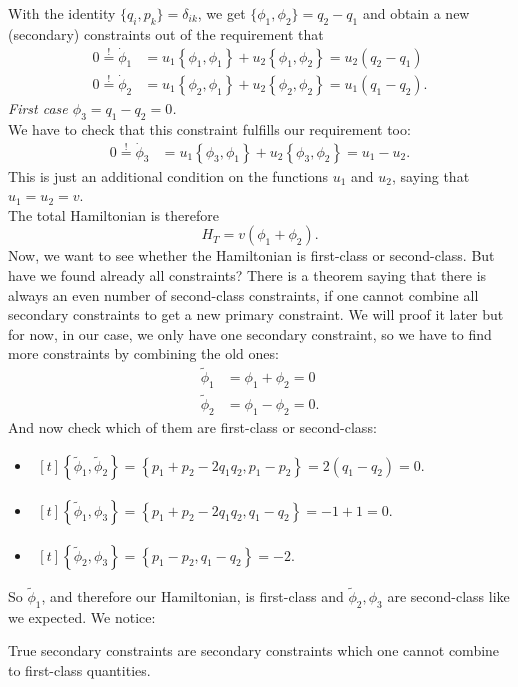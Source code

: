 With the identity $\{ q_i, p_k \} = \delta_{ik}$, we get $\{ \phi_1 , \phi_2 \} = q_2 - q_1$ and obtain a new (secondary) constraints out of the requirement that
\begin{align}
0 \overset{!}{=} \dot{\phi}_1 &= u_1 \left \{ \phi_1, \phi_1 \right \} + u_2 \left \{ \phi_1, \phi_2 \right \} = u_2 (q_2 - q_1) \\
0 \overset{!}{=} \dot{\phi}_2 &= u_1 \left \{ \phi_2, \phi_1 \right \} + u_2 \left \{ \phi_2, \phi_2 \right \} = u_1 (q_1 - q_2).
\end{align}
\textit{First case $\phi_3 = q_1 - q_2 = 0$.} \\
We have to check that this constraint fulfills our requirement too:
\begin{align}
0 \overset{!}{=} \dot{\phi}_3 &= u_1 \left \{ \phi_3, \phi_1 \right \} + u_2 \left \{ \phi_3, \phi_2 \right \} = u_1 - u_2.
\end{align}
This is just an additional condition on the functions $u_1$ and $u_2$, saying that $u_1 = u_2 = v$. \\

The total Hamiltonian is therefore
\begin{equation}
H_T = v ( \phi_1 + \phi_2 ).
\end{equation}
Now, we want to see whether the Hamiltonian is first-class or second-class. But have we found already all constraints? There is a theorem saying that there is always an even number of second-class constraints, if one cannot combine all secondary constraints to get a new primary constraint. We will proof it later but for now, in our case, we only have one secondary constraint, so we have to find more constraints by combining the old ones:
\begin{align}
\tilde{\phi}_1 &= \phi_1 + \phi_2 = 0 \\
\tilde{\phi}_2 &= \phi_1 - \phi_2 = 0.
\end{align}
And now check which of them are first-class or second-class:
\begin{itemize}
\item \(
\begin{aligned}[t]
\left \{ \tilde{\phi}_1,\tilde{\phi}_2 \right \} = \left \{ p_1 + p_2 - 2 q_1 q_2, p_1 - p_2 \right \} = 2 (q_1 - q_2) = 0.
\end{aligned} \)
\item \(
\begin{aligned}[t]
\left \{ \tilde{\phi}_1,\phi_3 \right \} = \left \{ p_1 + p_2 - 2 q_1 q_2, q_1 - q_2 \right \} = -1 + 1 = 0.
\end{aligned} \)
\item \(
\begin{aligned}[t]
\left \{ \tilde{\phi}_2,\phi_3 \right \} = \left \{ p_1 - p_2, q_1 - q_2 \right \} = -2.
\end{aligned} \)
\end{itemize}
So $\tilde{\phi}_1$, and therefore our Hamiltonian, is first-class and $\tilde{\phi}_2,\phi_3$ are second-class like we expected. We notice:
\begin{definition}
True secondary constraints are secondary constraints which one cannot combine to first-class quantities.
\end{definition}

